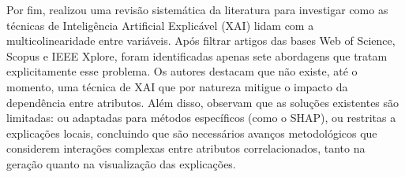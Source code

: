 Por fim,  realizou uma revisão sistemática da literatura para investigar como as técnicas de Inteligência Artificial Explicável (XAI) lidam com a multicolinearidade entre variáveis. Após filtrar artigos das bases Web of Science, Scopus e IEEE Xplore, foram identificadas apenas sete abordagens que tratam explicitamente esse problema. Os autores destacam que não existe, até o momento, uma técnica de XAI que por natureza mitigue o impacto da dependência entre atributos. Além disso, observam que as soluções existentes são limitadas: ou adaptadas para métodos específicos (como o SHAP), ou restritas a explicações locais, concluindo que são necessários avanços metodológicos que considerem interações complexas entre atributos correlacionados, tanto na geração quanto na visualização das explicações.




